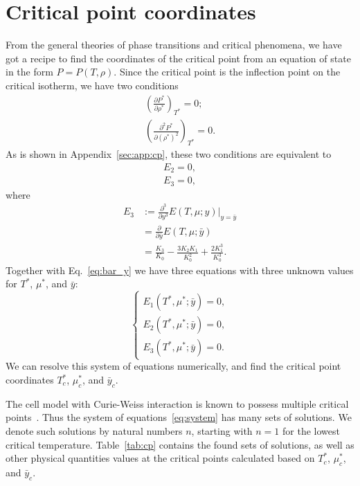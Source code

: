 \documentclass[12pt]{article}
\numberwithin{equation}{section}
\begin{document}
	\pagebreak
	\section{\label{sec:CP} Critical point coordinates}
	From the general theories of phase transitions and critical phenomena, we have got a recipe to find the coordinates of the critical point from an equation of state in the form $P=P(T,\rho)$. Since the critical point is the inflection point on the critical isotherm, we have two conditions
	\begin{equation}
		\begin{split}
			\left(\frac{\partial P^*}{\partial \rho^*}\right)_{T^*} = 0;
			\\
			\left(\frac{\partial^2 P^*}{\partial (\rho^*)^2}\right)_{T^*} = 0.
		\end{split}		
	\end{equation}
	As is shown in Appendix~\ref{sec:app:cp}, these two conditions are equivalent to
	\begin{equation}
		\begin{split}
			E_2 = 0,
			\\
			E_3 = 0,
		\end{split}
	\end{equation}
	where
	\begin{equation}
		\begin{split}
			E_3 &:= \frac{\partial^3}{\partial y^3} E(T,\mu; y)\big|_{y=\bar{y}} 
			\\
			& = \frac{\partial}{\partial \bar{y}} E(T,\mu; \bar{y})
			\\
			& = \frac{K_3}{K_0} - \frac{3 K_2 K_1}{K_0^2} + \frac{2K_1^3}{K_0^3}.
		\end{split}
	\end{equation}
	Together with Eq.~\eqref{eq:bar_y} we have three equations with three unknown values for $T^*$, $\mu^*$, and $\bar{y}$:
	\begin{equation}
		\label{eq:system}
		\begin{cases}
			E_1(T^*,\mu^*; \bar{y}) = 0,\\
			E_2(T^*,\mu^*; \bar{y}) = 0,\\
			E_3(T^*,\mu^*; \bar{y}) = 0.
		\end{cases}
	\end{equation}
	We can resolve this system of equations numerically, and find the critical point coordinates $T^*_c$, $\mu^*_c$, and $\bar{y}_c$.
	
	The cell model with Curie-Weiss interaction is known to possess multiple critical points~\cite{KKD18,KKD20,KD22}. Thus the system of equations~\eqref{eq:system} has many sets of solutions. We denote such solutions by natural numbers $n$, starting with $n=1$ for the lowest critical temperature. Table~\ref{tab:cp} contains the found sets of solutions, as well as other physical quantities values at the critical points calculated based on $T^*_c$, $\mu^*_c$, and $\bar{y}_c$.
	
\end{document}
